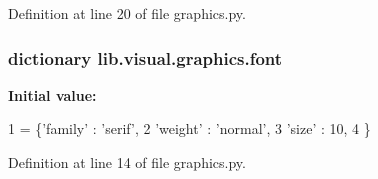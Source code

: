 Definition at line 20 of file graphics.\+py.

\hypertarget{a00152_a3c83ccb4d4d1fcb0ea5f6b8616a1d0df}{
\subsubsection[{font}]{\setlength{\rightskip}{0pt plus 5cm}dictionary lib.\+visual.\+graphics.\+font}}\label{a00152_a3c83ccb4d4d1fcb0ea5f6b8616a1d0df}
{\bfseries Initial value\+:}
\begin{DoxyCode}
1 = \{\textcolor{stringliteral}{'family'} : \textcolor{stringliteral}{'serif'},
2         \textcolor{stringliteral}{'weight'} : \textcolor{stringliteral}{'normal'},
3         \textcolor{stringliteral}{'size'}   : 10,
4         \}
\end{DoxyCode}


Definition at line 14 of file graphics.\+py.

